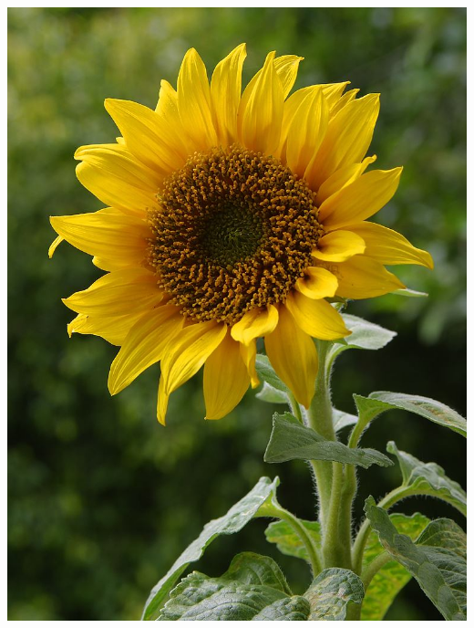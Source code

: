 \documentclass{article}
\begin{document}
\begin{center}
\includegraphics[width=0.9\textheight, angle=90]{../Sunflower.jpg}
\end{center}
\newpage
\end{document}
